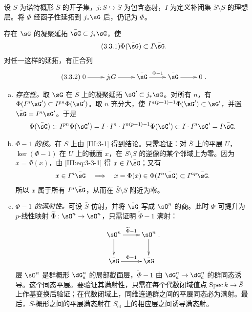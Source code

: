 \subsection{}\label{III:3-2}
设 $S$ 为诺特概形 $\bar S$ 的开子集，$j:S\hookrightarrow\bar S$ 为包含态射，$I$ 为定义补闭集 $\bar S\setminus S$ 的理想层。将 $\Phi$ 经函子性延拓到 $j_*\sG$ 后，仍记为 $\Phi$。
\begin{lemma_}\label{III:3-3}
存在 $\sG$ 的凝聚延拓 $\bar\sG\subset j_*\sG$，使
\begin{equation*}\tag{3.3.1}\label{III:eq:3-3-1}
\Phi(\bar\sG)\subset I\bar\sG.
\end{equation*}
对任一这样的延拓，有正合列
\begin{equation*}\tag{3.3.2}\label{III:eq:3-3-2}
\xymatrix{0\ar[r]&j_!G\ar[r]&\bar\sG\ar[r]^-{\Phi-1}&\bar\sG\ar[r]&0}.
\end{equation*}
\end{lemma_}
\begin{enumerate}[a)]
\item \emph{存在性。}取 $\sG$ 在 $\bar S$ 上的凝聚延拓 $\sG'\subset j_*\sG$。对所有 $n$，有 $\Phi(I^n\sG')\subset I^{pn}\Phi(\sG')$。取 $n$ 充分大，使 $I^{n(p-1)-1}\Phi(\sG')\subset\sG'$，并置 $\bar\sG=I^n\sG'$。于是
\[\Phi(\bar\sG)\subset I^{pn}\Phi(\sG')=I\cdot I^n\cdot I^{n(p-1)-1}\Phi(\sG')\subset I\cdot I^n\sG'=I\bar\sG.\]
\item \emph{$\Phi-1$ 的核。}在 $S$ 上由 \ref{III:3-1} 得到结论。只需验证：对 $\bar S$ 上的平展 $U$，$\ker(\Phi-1)$ 在 $U$ 上的截面 $x$，在 $\bar S\setminus S$ 的逆像的某个邻域上为零。因为 $x=\Phi(x)$，由 \eqref{III:eq:3-3-1} 得 $x\in I\bar\sG$；又有
\[x\in I^n\bar\sG\quad\Longrightarrow\quad x=\Phi(x)\in\Phi(I^n\bar\sG)\subset I^{np}\bar\sG.\]
所以 $x$ 属于所有 $I^n\bar\sG$，从而在 $\bar S\setminus S$ 附近为零。
\item \emph{$\Phi-1$ 的满射性。}可设 $\bar S$ 仿射，并将 $\bar\sG$ 写成 $\sO^n$ 的商。此时 $\Phi$ 可提升为 $p$-线性映射 $\widetilde\Phi:\sO^n\to\sO^n$，只需证明 $\widetilde\Phi-1$ 满射：
\[\xymatrix{\sO^n\ar[r]^-{\widetilde\Phi-1}\ar[d]&\sO^n\ar[d]\\\bar\sG\ar[r]^-{\Phi-1}&\bar\sG}.\]
层 $\sO^n$ 是群概形 $\dG_a^n$ 的局部截面层，$\widetilde\Phi-1$ 由 $\dG_a^n\to\dG_a^n$ 的群同态诱导。这个同态平展。要验证其满射性，只需在每个代数闭域值点 $\operatorname{Spec} k\to\bar S$ 上作基变换后验证；在代数闭域上，同维连通群之间的平展同态必为满射。最后，$\bar S$-概形之间的平展满态射在 $\bar S_{\mathrm{\acute et}}$ 上的相应层之间诱导满态射。
\end{enumerate}

